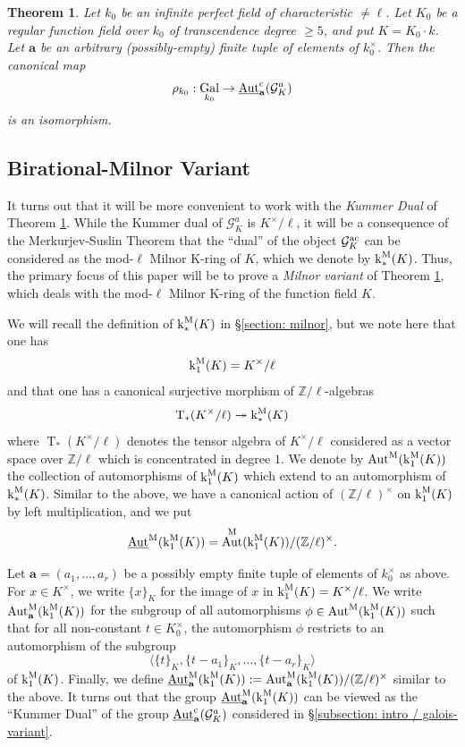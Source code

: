 \documentclass[11pt]{amsart}
\newtheorem{maintheorem}{Theorem}
\theoremstyle{definition}
\theoremstyle{remark}
\numberwithin{equation}{section}
\DeclareMathOperator{\Aut}{Aut}
\DeclareMathOperator{\Gal}{Gal}
\newcommand{\Z}{\mathbb{Z}}
\newcommand{\Gc}{\mathcal{G}}
\newcommand{\abf}{\mathbf{a}}
\newcommand{\Autm}{\Aut^{\rm M}}
\newcommand{\UAutc}{\underline{\Aut}^{\rm c}}
\newcommand{\UAutm}{\underline{\Aut}^{\rm M}}
\renewcommand{\k}{\operatorname{k}^{\rm M}}
\newcommand{\ac}{{\rm ac}}
\newcommand{\Galk}{{\Gal_{k_0}}}
\begin{document}
\begin{maintheorem}
\label{maintheorem: intro / galois-variant / galois-main}
  Let $k_0$ be an infinite perfect field of characteristic $\neq \ell$.
  Let $K_0$ be a regular function field over $k_0$ of transcendence degree $\geq 5$, and put $K = K_0 \cdot k$.
  Let $\abf$ be an arbitrary (possibly-empty) finite tuple of elements of $k_0^\times$.
  Then the canonical map
  \[ \rho_{k_0} : \Galk \rightarrow \UAutc_\abf(\Gc_K^a) \]
  is an isomorphism.
\end{maintheorem}

\subsection{Birational-Milnor Variant}
\label{subsection: intro / milnor-variant}

It turns out that it will be more convenient to work with the \emph{Kummer Dual} of Theorem \ref{maintheorem: intro / galois-variant / galois-main}.
While the Kummer dual of $\Gc_K^a$ is $K^\times/\ell$, it will be a consequence of the Merkurjev-Suslin Theorem \cite{Merkurjev:1982} that the ``dual'' of the object $\Gc_K^\ac$ can be considered as the mod-$\ell$ Milnor K-ring of $K$, which we denote by $\k_*(K)$.
Thus, the primary focus of this paper will be to prove a \emph{Milnor variant} of Theorem \ref{maintheorem: intro / galois-variant / galois-main}, which deals with the mod-$\ell$ Milnor K-ring of the function field $K$.

We will recall the definition of $\k_*(K)$ in \S\ref{section: milnor}, but we note here that one has 
\[ \k_1(K) = K^\times/\ell \]
and that one has a canonical surjective morphism of $\Z/\ell$-algebras
\[ \operatorname{T}_*(K^\times/\ell) \twoheadrightarrow \k_*(K) \]
where $\operatorname{T}_*(K^\times/\ell)$ denotes the tensor algebra of $K^\times/\ell$ considered as a vector space over $\Z/\ell$ which is concentrated in degree $1$.
We denote by $\Autm(\k_1(K))$ the collection of automorphisms of $\k_1(K)$ which extend to an automorphism of $\k_*(K)$.
Similar to the above, we have a canonical action of $(\Z/\ell)^\times$ on $\k_1(K)$ by left multiplication, and we put
\[ \UAutm(\k_1(K)) = \Autm(\k_1(K))/(\Z/\ell)^\times. \]

Let $\abf = (a_1,\ldots,a_r)$ be a possibly empty finite tuple of elements of $k_0^\times$ as above.
For $x \in K^\times$, we write $\{x\}_K$ for the image of $x$ in $\k_1(K) = K^\times/\ell$.
We write $\Autm_\abf(\k_1(K))$ for the subgroup of all automorphisms $\phi \in \Autm(\k_1(K))$ such that for all non-constant $t \in K_0^\times$, the automorphism $\phi$ restricts to an automorphism of the subgroup
\[ \langle \{t\}_K,\{t-a_1\}_K, \ldots, \{t-a_r\}_K \rangle \]
of $\k_1(K)$.
Finally, we define $\UAutm_\abf(\k_1(K)) := \Autm_\abf(\k_1(K))/(\Z/\ell)^\times$ similar to the above.
It turns out that the group $\UAutm_\abf(\k_1(K))$ can be viewed as the ``Kummer Dual'' of the group $\UAutc_\abf(\Gc_K^a)$ considered in \S\ref{subsection: intro / galois-variant}.
\end{document}
